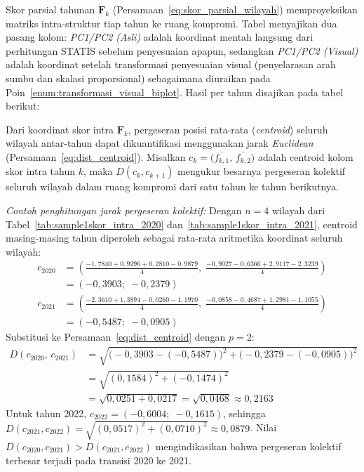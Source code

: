 Skor parsial tahunan $\mathbf{F}_k$ (Persamaan~\ref{eq:skor_parsial_wilayah}) memproyeksikan matriks intra-struktur tiap tahun ke ruang kompromi. Tabel menyajikan dua pasang kolom: \textit{PC1/PC2 (Asli)} adalah koordinat mentah langsung dari perhitungan STATIS sebelum penyesuaian apapun, sedangkan \textit{PC1/PC2 (Visual)} adalah koordinat setelah transformasi penyesuaian visual (penyelarasan arah sumbu dan skalasi proporsional) sebagaimana diuraikan pada Poin~\ref{enum:transformasi_visual_biplot}. Hasil per tahun disajikan pada tabel berikut:
{\captionsetup[table]{list=no}}
{\captionsetup[table]{list=no}}
{\captionsetup[table]{list=no}}

Dari koordinat skor intra $\mathbf{F}_k$, pergeseran posisi rata-rata (\textit{centroid}) seluruh wilayah antar-tahun dapat dikuantifikasi menggunakan jarak \textit{Euclidean} (Persamaan~\ref{eq:dist_centroid}). Misalkan $c_k = \bigl(\overline{f_{k,1}},\,\overline{f_{k,2}}\bigr)$ adalah centroid kolom skor intra tahun $k$, maka $D(c_k, c_{k+1})$ mengukur besarnya pergeseran kolektif seluruh wilayah dalam ruang kompromi dari satu tahun ke tahun berikutnya.

\label{par:contoh_centroid_shift}
\noindent\textit{Contoh penghitungan jarak pergeseran kolektif:} Dengan $n=4$ wilayah dari Tabel~\ref{tab:sample1skor_intra_2020} dan~\ref{tab:sample1skor_intra_2021}, centroid masing-masing tahun diperoleh sebagai rata-rata aritmetika koordinat seluruh wilayah:
\begin{align*}
  c_{2020} &= \left(\tfrac{-1{,}7840+0{,}9296+0{,}2810-0{,}9879}{4},\;\tfrac{-0{,}9027-0{,}6366+2{,}9117-2{,}3239}{4}\right) \\
  &= (-0{,}3903;\;-0{,}2379) \\[4pt]
  c_{2021} &= \left(\tfrac{-2{,}3610+1{,}3894-0{,}0260-1{,}1970}{4},\;\tfrac{-0{,}0858-0{,}4687+1{,}2981-1{,}1055}{4}\right) \\
  &= (-0{,}5487;\;-0{,}0905)
\end{align*}
Substitusi ke Persamaan~\ref{eq:dist_centroid} dengan $p=2$:
\begin{align*}
  D(c_{2020},\,c_{2021})
  &= \sqrt{\bigl(-0{,}3903-(-0{,}5487)\bigr)^2+\bigl(-0{,}2379-(-0{,}0905)\bigr)^2} \\
  &= \sqrt{(0{,}1584)^2+(-0{,}1474)^2} \\
  &= \sqrt{0{,}0251+0{,}0217} = \sqrt{0{,}0468} \approx 0{,}2163
\end{align*}
Untuk tahun 2022, $c_{2022} = (-0{,}6004;\;-0{,}1615)$, sehingga $D(c_{2021},c_{2022}) = \sqrt{(0{,}0517)^2+(0{,}0710)^2} \approx 0{,}0879$. Nilai $D(c_{2020},c_{2021})>D(c_{2021},c_{2022})$ mengindikasikan bahwa pergeseran kolektif terbesar terjadi pada transisi 2020 ke 2021.

